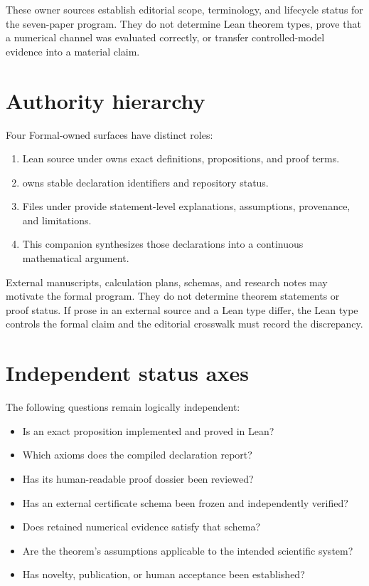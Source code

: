 These owner sources establish editorial scope, terminology, and lifecycle status for the
seven-paper program.  They do not determine Lean theorem types, prove that a numerical
channel was evaluated correctly, or transfer controlled-model evidence into a material
claim.

\section{Authority hierarchy}

Four Formal-owned surfaces have distinct roles:

\begin{enumerate}
  \item Lean source under  owns exact definitions,
        propositions, and proof terms.
  \item {} owns stable declaration identifiers and
        repository status.
  \item Files under  provide statement-level explanations,
        assumptions, provenance, and limitations.
  \item This companion synthesizes those declarations into a continuous mathematical
        argument.
\end{enumerate}

External manuscripts, calculation plans, schemas, and research notes may motivate the
formal program. They do not determine theorem statements or proof status. If prose in an
external source and a Lean type differ, the Lean type controls the formal claim and the
editorial crosswalk must record the discrepancy.

\section{Independent status axes}

The following questions remain logically independent:

\begin{itemize}
  \item Is an exact proposition implemented and proved in Lean?
  \item Which axioms does the compiled declaration report?
  \item Has its human-readable proof dossier been reviewed?
  \item Has an external certificate schema been frozen and independently verified?
  \item Does retained numerical evidence satisfy that schema?
  \item Are the theorem's assumptions applicable to the intended scientific system?
  \item Has novelty, publication, or human acceptance been established?
\end{itemize}


